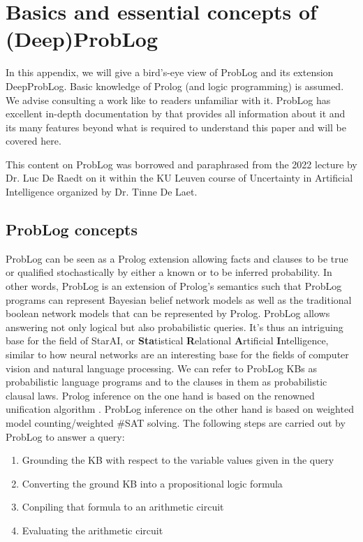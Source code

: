 \chapter{Basics and essential concepts of (Deep)ProbLog} \label{problog_deepproblog_essentials}
In this appendix, we will give a bird's-eye view of ProbLog and its extension DeepProbLog. Basic knowledge of Prolog (and logic programming) is assumed. We advise consulting a work like \cite{learnprolognow} to readers unfamiliar with it. ProbLog has excellent in-depth documentation by \cite{problog_documentation} that provides all information about it and its many features beyond what is required to understand this paper and will be covered here.

This content on ProbLog was borrowed and paraphrased from the 2022 lecture by Dr. Luc De Raedt on it within the KU Leuven course of Uncertainty in Artificial Intelligence organized by Dr. Tinne De Laet.

\section{ProbLog concepts}
ProbLog can be seen as a Prolog extension allowing facts and clauses to be true or qualified stochastically by either a known or to be inferred probability. In other words, ProbLog is an extension of Prolog's semantics such that ProbLog programs can represent Bayesian belief network models as well as the traditional boolean network models that can be represented by Prolog. ProbLog allows answering not only logical but also probabilistic queries. It's thus an intriguing base for the field of StarAI, or \textbf{Sta}tistical \textbf{R}elational \textbf{A}rtificial \textbf{I}ntelligence, similar to how neural networks are an interesting base for the fields of computer vision and natural language processing. We can refer to ProbLog KBs as probabilistic language programs and to the clauses in them as probabilistic clausal laws.
Prolog inference on the one hand is based on the renowned unification algorithm \cite{how_prolog_works}. ProbLog inference on the other hand is based on weighted model counting/weighted \#SAT solving. The following steps are carried out by ProbLog to answer a query:
\begin{enumerate}
  \item Grounding the KB with respect to the variable values given in the query
  \item Converting the ground KB into a propositional logic formula
  \item Conpiling that formula to an arithmetic circuit
  \item Evaluating the arithmetic circuit
\end{enumerate}

